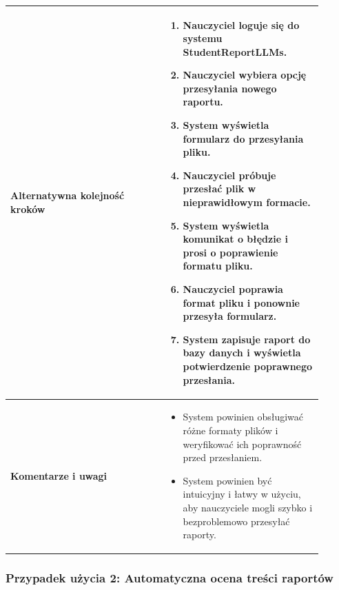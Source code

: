 \documentclass[a4paper, 12pt]{article}
\begin{document}
\begin{table}[H]
\begin{tabular}{|p{0.45\linewidth}|p{0.45\linewidth}|}
\hline
\textbf{Alternatywna kolejność kroków} &
\begin{enumerate}
    \item Nauczyciel loguje się do systemu StudentReportLLMs.
    \item Nauczyciel wybiera opcję przesyłania nowego raportu.
    \item System wyświetla formularz do przesyłania pliku.
    \item Nauczyciel próbuje przesłać plik w nieprawidłowym formacie.
    \item System wyświetla komunikat o błędzie i prosi o poprawienie formatu pliku.
    \item Nauczyciel poprawia format pliku i ponownie przesyła formularz.
    \item System zapisuje raport do bazy danych i wyświetla potwierdzenie poprawnego przesłania.
\end{enumerate} \\
\hline
\textbf{Komentarze i uwagi} &
\begin{itemize}
    \item System powinien obsługiwać różne formaty plików i weryfikować ich poprawność przed przesłaniem.
    \item System powinien być intuicyjny i łatwy w użyciu, aby nauczyciele mogli szybko i bezproblemowo przesyłać raporty.
\end{itemize} \\
\hline
\end{tabular}
\end{table}

\subsubsection{Przypadek użycia 2: Automatyczna ocena treści raportów}
\end{document}
